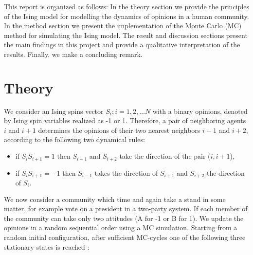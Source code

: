 \documentclass[a4paper]{article}
\begin{document}
This report is organized as follows: In the theory section we provide the principles of the Ising model for modelling the dynamics of opinions in a human community. In the method section we present the implementation of the Monte Carlo (MC) method for simulating the Ising model. The result and discussion sections present the main findings in this project and provide a qualitative interpretation of the results. Finally, we make a concluding remark.


\newpage

\section{Theory}
We consider an Ising spins vector $S_i; i=1,2,\dots N$ with a binary opinions, denoted by Ising spin variables realized as -1 or 1. Therefore, a pair of neighboring agents $i$ and $i + 1$ determines the opinions of their two nearest neighbors $i-1$ and $i+2$, according to the following two dynamical rules:

\begin{itemize}
\item if $S_iS_{i+1}=1$ then $S_{i-1}$ and $S_{i+2}$ take the direction of the pair ($i,i+1$),

\item if $S_iS_{i+1}=-1$ then $S_{i-1}$ takes the direction of $S_{i+1}$ and $S_{i+2}$ the direction of $S_i$. 
\end{itemize}

We now consider a community which time and again take a stand in some matter, for example vote on a president in a two-party system. If each member of the community can take only two attitudes (A for -1 or B for 1).  We update the opinions in a random sequential order using a MC simulation. Starting from a random initial configuration, after sufficient MC-cycles one of the following three stationary states is reached \cite{opinion}:
\end{document}
